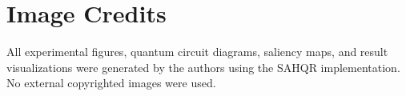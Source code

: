 \documentclass{ipol}
\begin{document}
\section*{Image Credits}
{\small All experimental figures, quantum circuit diagrams, saliency maps, and result visualizations were generated by the authors using the SAHQR implementation. No external copyrighted images were used.}




\end{document}
